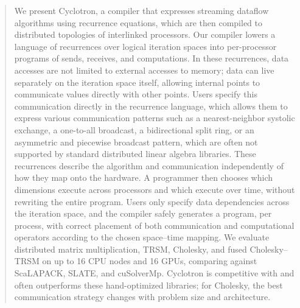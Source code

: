 \documentclass[sigplan, nonacm]{acmart}
\begin{document}
\begin{abstract}
We present Cyclotron, a compiler that expresses streaming dataflow algorithms
using recurrence equations, which are then compiled to distributed topologies
of interlinked processors. Our compiler lowers a language of recurrences over logical
iteration spaces into per-processor programs of sends, receives,
and computations. In these recurrences, data accesses are not limited to external accesses to memory; data can live separately on the iteration space itself, allowing internal points to  communicate values directly with other points. Users specify this communication directly in the  recurrence language, which allows them to express various communication patterns such as  a nearest-neighbor systolic exchange, a one-to-all broadcast, a bidirectional split ring, or an asymmetric and piecewise broadcast pattern, which are often not supported by standard distributed linear algebra libraries. These recurrences describe the algorithm and communication independently of how they map onto the hardware. A programmer then chooses which dimensions execute across processors and which execute over time, without rewriting the entire program. Users only specify data dependencies across the iteration space, and the compiler safely generates a program, per process, with correct placement of both communication and computational operators according to the chosen space--time mapping. We evaluate distributed matrix multiplication, TRSM, Cholesky, and fused Cholesky--TRSM on up to 16 CPU nodes and 16 GPUs, comparing against ScaLAPACK, SLATE, and cuSolverMp. Cyclotron is competitive with and often outperforms these hand-optimized libraries; for Cholesky, the best communication strategy changes with problem size and architecture.
\end{abstract}
\end{document}
